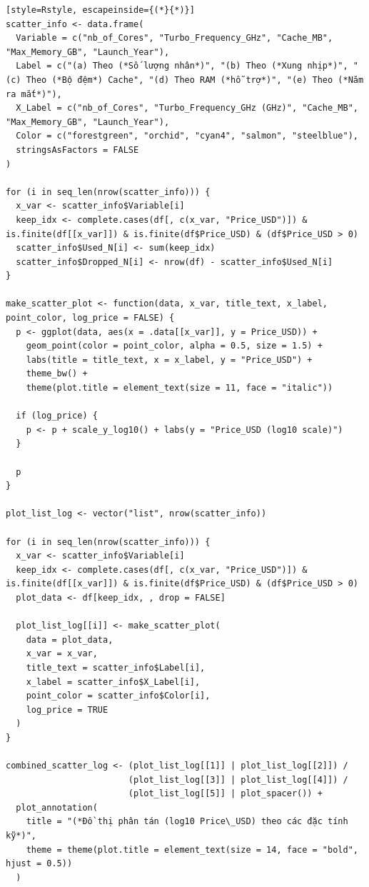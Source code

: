 \documentclass[12pt, a4paper]{article}
\begin{document}
\begin{lstlisting}[style=Rstyle, escapeinside={(*}{*)}]
scatter_info <- data.frame(
  Variable = c("nb_of_Cores", "Turbo_Frequency_GHz", "Cache_MB", "Max_Memory_GB", "Launch_Year"),
  Label = c("(a) Theo (*Số lượng nhân*)", "(b) Theo (*Xung nhịp*)", "(c) Theo (*Bộ đệm*) Cache", "(d) Theo RAM (*hỗ trợ*)", "(e) Theo (*Năm ra mắt*)"),
  X_Label = c("nb_of_Cores", "Turbo_Frequency_GHz (GHz)", "Cache_MB", "Max_Memory_GB", "Launch_Year"),
  Color = c("forestgreen", "orchid", "cyan4", "salmon", "steelblue"),
  stringsAsFactors = FALSE
)

for (i in seq_len(nrow(scatter_info))) {
  x_var <- scatter_info$Variable[i]
  keep_idx <- complete.cases(df[, c(x_var, "Price_USD")]) & is.finite(df[[x_var]]) & is.finite(df$Price_USD) & (df$Price_USD > 0)
  scatter_info$Used_N[i] <- sum(keep_idx)
  scatter_info$Dropped_N[i] <- nrow(df) - scatter_info$Used_N[i]
}

make_scatter_plot <- function(data, x_var, title_text, x_label, point_color, log_price = FALSE) {
  p <- ggplot(data, aes(x = .data[[x_var]], y = Price_USD)) +
    geom_point(color = point_color, alpha = 0.5, size = 1.5) +
    labs(title = title_text, x = x_label, y = "Price_USD") +
    theme_bw() +
    theme(plot.title = element_text(size = 11, face = "italic"))

  if (log_price) {
    p <- p + scale_y_log10() + labs(y = "Price_USD (log10 scale)")
  }

  p
}

plot_list_log <- vector("list", nrow(scatter_info))

for (i in seq_len(nrow(scatter_info))) {
  x_var <- scatter_info$Variable[i]
  keep_idx <- complete.cases(df[, c(x_var, "Price_USD")]) & is.finite(df[[x_var]]) & is.finite(df$Price_USD) & (df$Price_USD > 0)
  plot_data <- df[keep_idx, , drop = FALSE]

  plot_list_log[[i]] <- make_scatter_plot(
    data = plot_data,
    x_var = x_var,
    title_text = scatter_info$Label[i],
    x_label = scatter_info$X_Label[i],
    point_color = scatter_info$Color[i],
    log_price = TRUE
  )
}

combined_scatter_log <- (plot_list_log[[1]] | plot_list_log[[2]]) /
                        (plot_list_log[[3]] | plot_list_log[[4]]) /
                        (plot_list_log[[5]] | plot_spacer()) +
  plot_annotation(
    title = "(*Đồ thị phân tán (log10 Price\_USD) theo các đặc tính kỹ*)",
    theme = theme(plot.title = element_text(size = 14, face = "bold", hjust = 0.5))
  )
\end{lstlisting}
\end{document}
